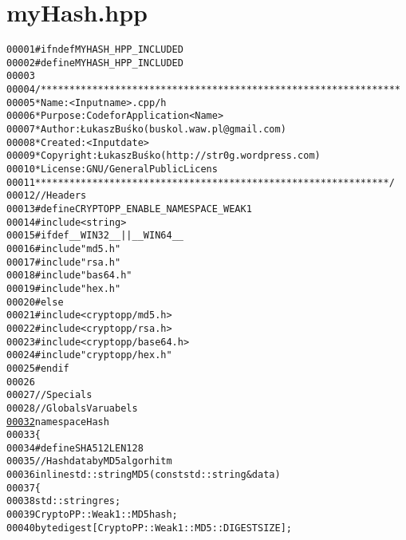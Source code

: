 \hypertarget{myHash_8hpp_source}{
\section{myHash.hpp}
}


\begin{footnotesize}\begin{alltt}
00001 \textcolor{preprocessor}{#ifndef MYHASH\_HPP\_INCLUDED}
00002 \textcolor{preprocessor}{}\textcolor{preprocessor}{#define MYHASH\_HPP\_INCLUDED}
00003 \textcolor{preprocessor}{}
00004 \textcolor{comment}{/***************************************************************}
00005 \textcolor{comment}{ * Name:      <Input name>.cpp/h}
00006 \textcolor{comment}{ * Purpose:   Code for Application <Name>}
00007 \textcolor{comment}{ * Author:    Łukasz Buśko (buskol.waw.pl@gmail.com)}
00008 \textcolor{comment}{ * Created:   <Input date>}
00009 \textcolor{comment}{ * Copyright: Łukasz Buśko (http://str0g.wordpress.com)}
00010 \textcolor{comment}{ * License:   GNU / General Public Licens}
00011 \textcolor{comment}{ **************************************************************/}
00012 \textcolor{comment}{//Headers}
00013 \textcolor{preprocessor}{#define CRYPTOPP\_ENABLE\_NAMESPACE\_WEAK 1}
00014 \textcolor{preprocessor}{}\textcolor{preprocessor}{#include <string>}
00015 \textcolor{preprocessor}{#ifdef \_\_WIN32\_\_ || \_\_WIN64\_\_}
00016 \textcolor{preprocessor}{}\textcolor{preprocessor}{#include "md5.h"}
00017 \textcolor{preprocessor}{#include "rsa.h"}
00018 \textcolor{preprocessor}{#include "bas64.h"}
00019 \textcolor{preprocessor}{#include "hex.h"}
00020 \textcolor{preprocessor}{#else}
00021 \textcolor{preprocessor}{}\textcolor{preprocessor}{#include <cryptopp/md5.h>}
00022 \textcolor{preprocessor}{#include <cryptopp/rsa.h>}
00023 \textcolor{preprocessor}{#include <cryptopp/base64.h>}
00024 \textcolor{preprocessor}{#include "cryptopp/hex.h"}
00025 \textcolor{preprocessor}{#endif}
00026 \textcolor{preprocessor}{}
00027 \textcolor{comment}{//Specials}
00028 \textcolor{comment}{//Globals Varuabels}
\hypertarget{myHash_8hpp_source_l00032}{}\hyperlink{namespaceHash}{00032} \textcolor{comment}{}\textcolor{keyword}{namespace }Hash
00033 \{
00034 \textcolor{preprocessor}{    #define SHA512LEN 128}
00035 \textcolor{preprocessor}{}        \textcolor{comment}{//Hash data by MD5 algorhitm}
00036         \textcolor{keyword}{inline} std::string MD5(\textcolor{keyword}{const} std::string &data)
00037         \{
00038                 std::string res;
00039                 CryptoPP::Weak1::MD5 hash;
00040                 byte digest[CryptoPP::Weak1::MD5::DIGESTSIZE];

\end{alltt}
\end{footnotesize}
